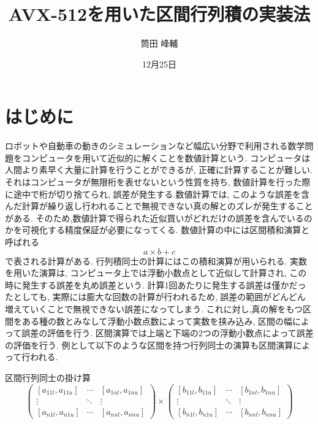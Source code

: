 \documentclass[11pt,a4paper]{jsreport}
\title{AVX-512を用いた区間行列積の実装法}
\author{筒田 峰輔}
\date{12月25日}
\theoremstyle{definition}
\begin{document}


\pagestyle{empty}
\maketitle
\tableofcontents
\clearpage
\pagestyle{plain}

\chapter{はじめに}
	ロボットや自動車の動きのシミュレーションなど幅広い分野で利用される数学問題をコンピュータを用いて近似的に解くことを数値計算という. コンピュータは人間より素早く大量に計算を行うことができるが, 正確に計算することが難しい. それはコンピュータが無限桁を表せないという性質を持ち, 数値計算を行った際に途中で桁が切り捨てられ, 誤差が発生する.数値計算では, このような誤差を含んだ計算が繰り返し行われることで無視できない真の解とのズレが発生することがある. そのため,数値計算で得られた近似買いがどれだけの誤差を含んでいるのかを可視化する精度保証が必要になってくる.
	数値計算の中には区間積和演算と呼ばれる
	\begin{equation*}
	a \times b + c
	\end{equation*}
で表される計算がある. 行列積同士の計算にはこの積和演算が用いられる. 実数を用いた演算は, コンピュータ上では浮動小数点として近似して計算され, この時に発生する誤差を丸め誤差という. 計算1回あたりに発生する誤差は僅かだったとしても, 実際には膨大な回数の計算が行われるため, 誤差の範囲がどんどん増えていくことで無視できない誤差になってしまう. これに対し,真の解をもつ区間をある種の数とみなして浮動小数点数によって実数を挟み込み, 区間の幅によって誤差の評価を行う. 区間演算では上端と下端の2つの浮動小数点によって誤差の評価を行う. 例として以下のような区間を持つ行列同士の演算も区間演算によって行われる.

\begin{itembox}[l]{区間行列同士の掛け算}
\[
\begin{pmatrix}
   [a_{11l},a_{11u}] & \cdots & [a_{1nl},a_{1nu}] \\
   \vdots & \ddots & \vdots \\
   [a_{n1l},a_{n1u}] & \cdots & [a_{nnl},a_{nnu}]
 \end{pmatrix}
 \times
 \begin{pmatrix}
   [b_{11l},b_{11u}] & \cdots & [b_{1nl},b_{1nu}] \\
    \vdots & \ddots & \vdots \\
   [b_{n1l},b_{n1u}] & \cdots & [b_{nnl},b_{nnu}]
 \end{pmatrix}
 \]
\end{itembox}
\end{document}
